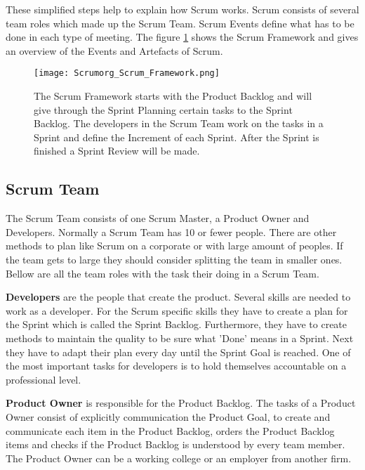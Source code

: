 These simplified steps help to explain how Scrum works. Scrum consists of several team roles which made up the Scrum Team. Scrum Events define what has to be done in each type of meeting. The figure \ref{fig:Scrum Framework} shows the Scrum Framework and gives an overview of the Events and Artefacts of Scrum. \cite{scrum_guide}


\begin{figure}[H]
    \centering
    \texttt{[image: Scrumorg\_Scrum\_Framework.png]}
    \caption{The Scrum Framework starts with the Product Backlog and will give through the Sprint Planning certain tasks to the Sprint Backlog. The developers in the Scrum Team work on the tasks in a Sprint and define the Increment of each Sprint. After the Sprint is finished a Sprint Review will be made. \cite{scrum_guide}}
    \label{fig:Scrum Framework}
\end{figure}


\subsection{Scrum Team} \label{sec:Scrum Team}
The Scrum Team consists of one Scrum Master, a Product Owner and Developers. Normally a Scrum Team has 10 or fewer people. There are other methods to plan like Scrum on a corporate or with large amount of peoples. If the team gets to large they should consider splitting the team in smaller ones. Bellow are all the team roles with the task their doing in a Scrum Team. \cite{scrum_guide}

\textbf{Developers} are the people that create the product. Several skills are needed to work as a developer. For the Scrum specific skills they have to create a plan for the Sprint which is called the Sprint Backlog. Furthermore, they have to create methods to maintain the quality to be sure what 'Done' means in a Sprint. Next they have to adapt their plan every day until the Sprint Goal is reached. One of the most important tasks for developers is to hold themselves accountable on a professional level. \cite{scrum_guide}

\textbf{Product Owner} is responsible for the Product Backlog. The tasks of a Product Owner consist of explicitly communication the Product Goal, to create and communicate each item in the Product Backlog, orders the Product Backlog items and checks if the Product Backlog is understood by every team member. \cite{scrum_guide} The Product Owner can be a working college or an employer from another firm.

